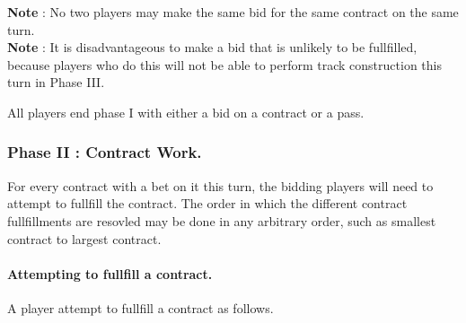 \documentclass[12pt, letterpaper]{article}
\begin{document}
\textbf{Note} : No two players may make the same bid for the same contract on the same turn.\\
\textbf{Note} : It is disadvantageous to make a bid that is unlikely to be fullfilled, because players who do this will not be able to perform track construction this turn in Phase III.

All players end phase I with either a bid on a contract or a pass.

\subsubsection{Phase II : Contract Work.}

For every contract with a bet on it this turn, the bidding players will need to attempt to fullfill the contract. The order in which the different contract fullfillments are resovled may be done in any arbitrary order, such as smallest contract to largest contract.

\paragraph{Attempting to fullfill a contract. } A player attempt to fullfill a contract as follows.
\end{document}
